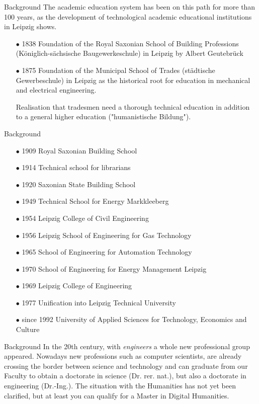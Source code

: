\documentclass{beamer}
\begin{document}
\begin{frame}{Background}
The academic education system has been on this path for more than 100 years,
as the development of technological academic educational institutions in
Leipzig shows.
\begin{itemize}
\item[$\bullet$] 1838 Foundation of the Royal Saxonian School of Building
  Professions (K\"oniglich-sächsische Baugewerkeschule) in Leipzig by Albert
  Geutebrück
\item[$\bullet$] 1875 Foundation of the Municipal School of Trades
  (st\"adtische Gewerbeschule) in Leipzig as the historical root for education
  in mechanical and electrical engineering.\medskip

  Realisation that tradesmen need a thorough technical education in addition
  to a general higher education ("humanistische Bildung").
\end{itemize}
\end{frame}

\begin{frame}{Background}
\begin{itemize}
\item[$\bullet$] 1909 Royal Saxonian Building School
\item[$\bullet$] 1914 Technical school for librarians
\item[$\bullet$] 1920 Saxonian State Building School
\item[$\bullet$] 1949 Technical School for Energy Markkleeberg
\item[$\bullet$] 1954 Leipzig College of Civil Engineering
\item[$\bullet$] 1956 Leipzig School of Engineering for Gas Technology
\item[$\bullet$] 1965 School of Engineering for Automation Technology
\item[$\bullet$] 1970 School of Engineering for Energy Management Leipzig
\item[$\bullet$] 1969 Leipzig College of Engineering
\item[$\bullet$] 1977 Unification into Leipzig Technical University
\item[$\bullet$] since 1992 University of Applied Sciences for Technology,
  Economics and Culture
\end{itemize}
\end{frame}

\begin{frame}{Background}
In the 20th century, with \emph{engineers} a whole new professional group
appeared.  Nowadays new professions such as computer scientists, are already
crossing the border between science and technology and can graduate from our
Faculty to obtain a doctorate in science (Dr. rer. nat.), but also a doctorate
in engineering (Dr.-Ing.).  The situation with the Humanities has not yet been
clarified, but at least you can qualify for a Master in Digital Humanities.
\end{frame}
\end{document}
